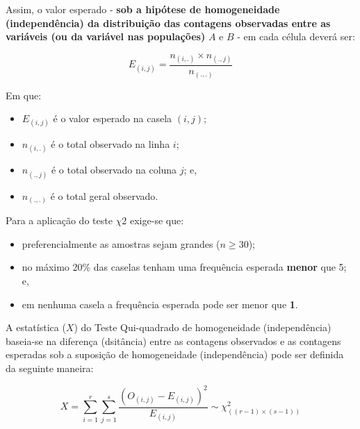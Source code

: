 \documentclass[
]{book}
\providecommand{\tightlist}{%
  \setlength{\itemsep}{0pt}\setlength{\parskip}{0pt}}
\begin{document}
\hfill\break

Assim, o valor esperado - \textbf{sob a hipótese de homogeneidade (independência) da distribuição das contagens observadas entre as variáveis (ou da variável nas populações)} \(A\) e \(B\) - em cada célula deverá ser:

\hfill\break

\[
E_{(i,j)} = \frac{n_{(i,.)} \times n_{(.,j)}}{n_{(.,.)}}
\]

\hfill\break

Em que:

\begin{itemize}
\tightlist
\item
  \(E_{(i,j)}\) é o valor esperado na casela \((i,j)\);\\
\item
  \(n_{(i,.)}\) é o total observado na linha \(i\);\\
\item
  \(n_{(.,j)}\) é o total observado na coluna \(j\); e,\\
\item
  \(n_{(.,.)}\) é o total geral observado.
\end{itemize}

\hfill\break

Para a aplicação do teste \(\chi{2}\) exige-se que:

\hfill\break

\begin{itemize}
\tightlist
\item
  preferencialmente as amostras sejam grandes (\(n \ge 30\));\\
\item
  no máximo 20\% das caselas tenham uma frequência esperada \textbf{menor} que 5; e,\\
\item
  em nenhuma casela a frequência esperada pode ser menor que \textbf{1}.
\end{itemize}

\hfill\break

A estatística (\(X\)) do Teste Qui-quadrado de homogeneidade (independência) baseia-se na diferença (dsitância) entre as contagens observados e as contagens esperadas sob a suposição de homogeneidade (independência) pode ser definida da seguinte maneira:

\hfill\break

\[
X=\sum_{i=1}^r\sum_{j=1}^s \frac{(O_{(i,j)} - E_{(i,j)})^2}{E_{(i,j)}}   \sim \chi^{2}_{((r-1)\times(s-1))}
\]
\end{document}

